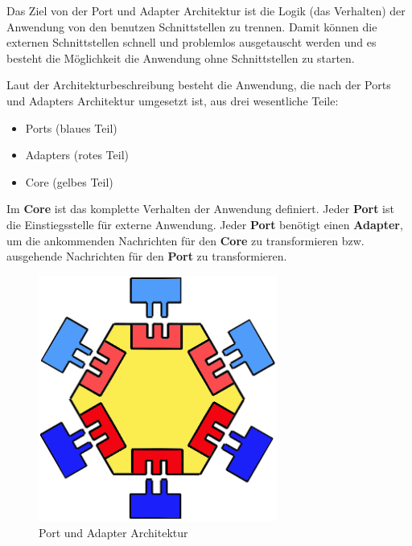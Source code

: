 Das Ziel von der Port und Adapter Architektur ist die Logik (das Verhalten) der Anwendung von
den benutzen Schnittstellen zu trennen. Damit können die externen Schnittstellen schnell und problemlos ausgetauscht werden und
es besteht die Möglichkeit die Anwendung ohne Schnittstellen zu starten. 

Laut der Architekturbeschreibung besteht die Anwendung, die nach der Ports und Adapters Architektur umgesetzt ist, aus drei wesentliche Teile:
\begin{itemize}
    \item Ports (blaues Teil)
    \item Adapters (rotes Teil)
    \item Core (gelbes Teil)
\end{itemize}

Im \textbf{Core} ist das komplette Verhalten der Anwendung definiert.
Jeder \textbf{Port} ist die Einstiegsstelle für externe Anwendung.
Jeder \textbf{Port} benötigt einen \textbf{Adapter}, um die ankommenden Nachrichten für den \textbf{Core} zu transformieren bzw. 
ausgehende Nachrichten für den \textbf{Port} zu transformieren.\cite{portAndAdapter}

\begin{figure}[H]
    \centering
    \includegraphics[width=0.7\textwidth]{./images/ports-and-adapters.png}
    \caption[Port und Adapter Architektur]{Port und Adapter Architektur \footnotemark}
    \label{fig:PortAndAdapterArchitecture}
\end{figure}
